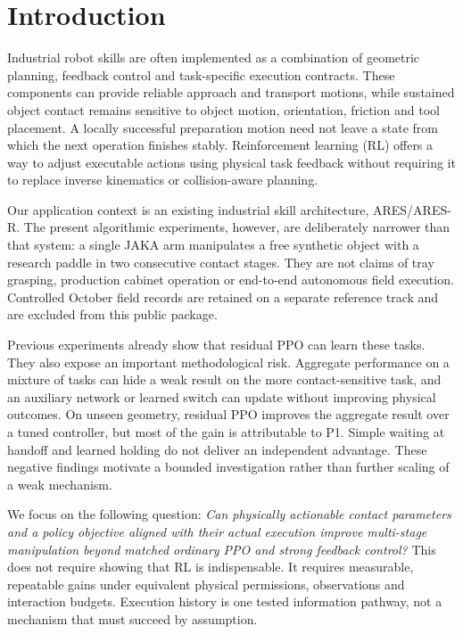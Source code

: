 \section{Introduction}
Industrial robot skills are often implemented as a combination of geometric planning, feedback control and task-specific execution contracts. These components can provide reliable approach and transport motions, while sustained object contact remains sensitive to object motion, orientation, friction and tool placement. A locally successful preparation motion need not leave a state from which the next operation finishes stably. Reinforcement learning (RL) offers a way to adjust executable actions using physical task feedback without requiring it to replace inverse kinematics or collision-aware planning.

Our application context is an existing industrial skill architecture, ARES/ARES-R. The present algorithmic experiments, however, are deliberately narrower than that system: a single JAKA arm manipulates a free synthetic object with a research paddle in two consecutive contact stages. They are not claims of tray grasping, production cabinet operation or end-to-end autonomous field execution. Controlled October field records are retained on a separate reference track and are excluded from this public package.

Previous experiments already show that residual PPO can learn these tasks. They also expose an important methodological risk. Aggregate performance on a mixture of tasks can hide a weak result on the more contact-sensitive task, and an auxiliary network or learned switch can update without improving physical outcomes. On unseen geometry, residual PPO improves the aggregate result over a tuned controller, but most of the gain is attributable to P1. Simple waiting at handoff and learned holding do not deliver an independent advantage. These negative findings motivate a bounded investigation rather than further scaling of a weak mechanism.

We focus on the following question: \emph{Can physically actionable contact parameters and a policy objective aligned with their actual execution improve multi-stage manipulation beyond matched ordinary PPO and strong feedback control?} This does not require showing that RL is indispensable. It requires measurable, repeatable gains under equivalent physical permissions, observations and interaction budgets. Execution history is one tested information pathway, not a mechanism that must succeed by assumption.

